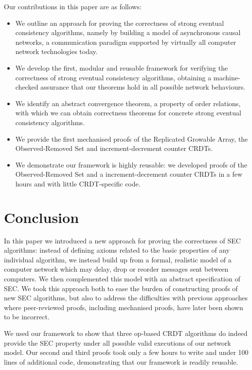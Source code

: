 \documentclass[acmlarge,review,anonymous]{acmart}\settopmatter{printfolios=true}
\begin{document}
Our contributions in this paper are as follows:
\begin{itemize}
\item We outline an approach for proving the correctness of strong eventual consistency algorithms, namely by building a model of asynchronous causal networks, a communication paradigm supported by virtually all computer network technologies today.
%
\item We develop the first, modular and reusable framework for verifying the correctness of strong eventual consistency algorithms, obtaining a machine-checked assurance that our theorems hold in all possible network behaviours.
%
\item We identify an abstract convergence theorem, a property of order relations, with which we can obtain correctness theorems for concrete strong eventual consistency algorithms.
%
\item We provide the first mechanised proofs of the Replicated Growable Array, the Observed-Removed Set and increment-decrement counter CRDTs. 
%
\item We demonstrate our framework is highly reusable: we developed proofs of the Observed-Removed Set and a increment-decrement counter CRDTs in a few hours and with little CRDT-specific code.
\end{itemize}









\section{Conclusion}
\label{sect.conclusion}

In this paper we introduced a new approach for proving the correctness of SEC algorithms: instead of defining axioms related to the basic properties of any individual algorithm, we instead build up from a formal, realistic model of a computer network which may delay, drop or reorder messages sent between computers.
We then complemented this model with an abstract specification of SEC.
We took this approach both to ease the burden of constructing proofs of new SEC algorithms, but also to address the difficulties with previous approaches where peer-reviewed proofs, including mechanised proofs, have later been shown to be incorrect.

We used our framework to show that three op-based CRDT algorithms do indeed provide the SEC property under all possible valid executions of our network model.
Our second and third proofs took only a few hours to write and under 100 lines of additional code, demonstrating that our framework is readily reusable.
\end{document}
